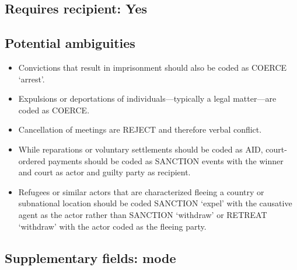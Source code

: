 \documentclass[11pt]{report}
\newcommand{\plcat}[1]{\textsf{#1}}
\begin{document}
\subsection{Requires recipient: Yes}

\subsection{Potential ambiguities}

\begin{itemize}
\item Convictions that result in imprisonment should also be coded as \plcat{COERCE} `arrest'.
\item Expulsions or deportations of individuals---typically a legal matter---are coded as \plcat{COERCE}.
\item Cancellation of meetings are \plcat{REJECT} and therefore verbal conflict.
\item While reparations or voluntary settlements should be coded as \plcat{AID}, court-ordered payments should be coded as \plcat{SANCTION} events with the winner and court as actor and guilty party as recipient.
\item Refugees or similar actors that are characterized fleeing a country or subnational location should be coded \plcat{SANCTION} `expel' with the causative agent as the actor rather than \plcat{SANCTION} `withdraw' or \plcat{RETREAT} `withdraw' with the actor coded as the fleeing party.
\end{itemize}

\subsection{Supplementary fields: mode}
\end{document}
